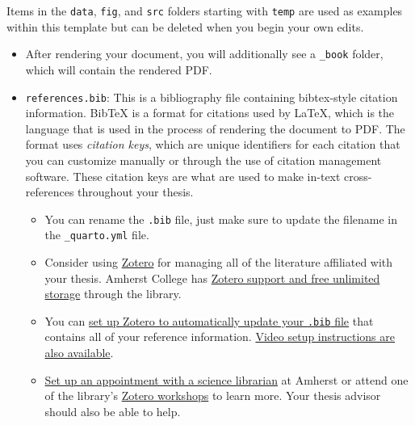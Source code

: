 \documentclass[
  11pt,
  letterpaper,
  twoside]{report}
\providecommand{\tightlist}{%
  \setlength{\itemsep}{0pt}\setlength{\parskip}{0pt}}\usepackage{longtable,booktabs,array}
\begin{document}
\begin{tcolorbox}[enhanced jigsaw, coltitle=black, leftrule=.75mm, titlerule=0mm, rightrule=.15mm, toprule=.15mm, opacityback=0, colbacktitle=quarto-callout-note-color!10!white, breakable, colback=white, left=2mm, opacitybacktitle=0.6, bottomtitle=1mm, bottomrule=.15mm, colframe=quarto-callout-note-color-frame, title=\textcolor{quarto-callout-note-color}{\faInfo}\hspace{0.5em}{Note}, arc=.35mm, toptitle=1mm]

Items in the \texttt{data}, \texttt{fig}, and \texttt{src} folders
starting with \texttt{temp} are used as examples within this template
but can be deleted when you begin your own edits.

\end{tcolorbox}

\begin{itemize}
\item
  After rendering your document, you will additionally see a
  \texttt{\_book} folder, which will contain the rendered PDF.
\item
  \texttt{references.bib}: This is a bibliography file containing
  bibtex-style citation information. BibTeX is a format for citations
  used by LaTeX, which is the language that is used in the process of
  rendering the document to PDF. The format uses \emph{citation keys},
  which are unique identifiers for each citation that you can customize
  manually or through the use of citation management software. These
  citation keys are what are used to make in-text cross-references
  throughout your thesis.

  \begin{itemize}
  \tightlist
  \item
    You can rename the \texttt{.bib} file, just make sure to update the
    filename in the \texttt{\_quarto.yml} file.
  \item
    Consider using \href{https://www.zotero.org/support/}{Zotero} for
    managing all of the literature affiliated with your thesis. Amherst
    College has
    \href{https://libguides.amherst.edu/citation/zotero}{Zotero support
    and free unlimited storage} through the library.
  \item
    You can
    \href{https://libguides.rhul.ac.uk/referencing/Zoterolatex}{set up
    Zotero to automatically update your \texttt{.bib} file} that
    contains all of your reference information.
    \href{https://guides.library.yale.edu/bibtex/zotero-and-latex}{Video
    setup instructions are also available}.
  \item
    \href{https://libguides.amherst.edu/subjectlibrarians\#s-lg-box-31290705}{Set
    up an appointment with a science librarian} at Amherst or attend one
    of the library's
    \href{https://libguides.amherst.edu/c.php?g=959622&p=6928473\#s-lg-box-22237086}{Zotero
    workshops} to learn more. Your thesis advisor should also be able to
    help.
  \end{itemize}
\end{itemize}
\end{document}
